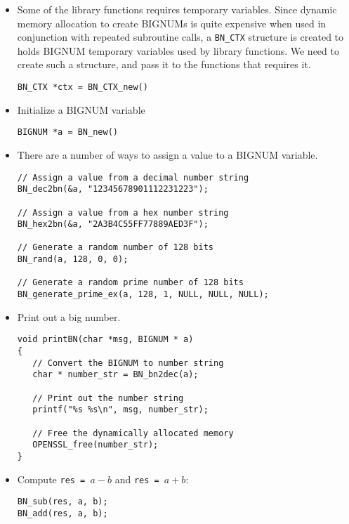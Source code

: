 \begin{itemize}

\item Some of the library functions requires temporary variables.
Since dynamic memory allocation to create BIGNUMs is quite expensive
when used in conjunction with repeated subroutine calls,
a \texttt{BN\_CTX} structure is created to holds BIGNUM temporary variables
used by library functions. We need to create such a structure, and pass
it to the functions that requires it.

\begin{lstlisting}
BN_CTX *ctx = BN_CTX_new()
\end{lstlisting}


\item Initialize a BIGNUM variable

\begin{lstlisting}
BIGNUM *a = BN_new()
\end{lstlisting}


\item There are a number of ways to assign a value to a BIGNUM variable.


\begin{lstlisting}
// Assign a value from a decimal number string
BN_dec2bn(&a, "12345678901112231223");

// Assign a value from a hex number string
BN_hex2bn(&a, "2A3B4C55FF77889AED3F");

// Generate a random number of 128 bits
BN_rand(a, 128, 0, 0);

// Generate a random prime number of 128 bits
BN_generate_prime_ex(a, 128, 1, NULL, NULL, NULL);
\end{lstlisting}


\item Print out a big number.

\begin{lstlisting}
void printBN(char *msg, BIGNUM * a)
{
   // Convert the BIGNUM to number string
   char * number_str = BN_bn2dec(a);

   // Print out the number string
   printf("%s %s\n", msg, number_str);

   // Free the dynamically allocated memory
   OPENSSL_free(number_str);
}
\end{lstlisting}


\item Compute \texttt{res = $a - b$} and \texttt{res = $a + b$}:

\begin{lstlisting}
BN_sub(res, a, b);
BN_add(res, a, b);
\end{lstlisting}




\end{itemize}
